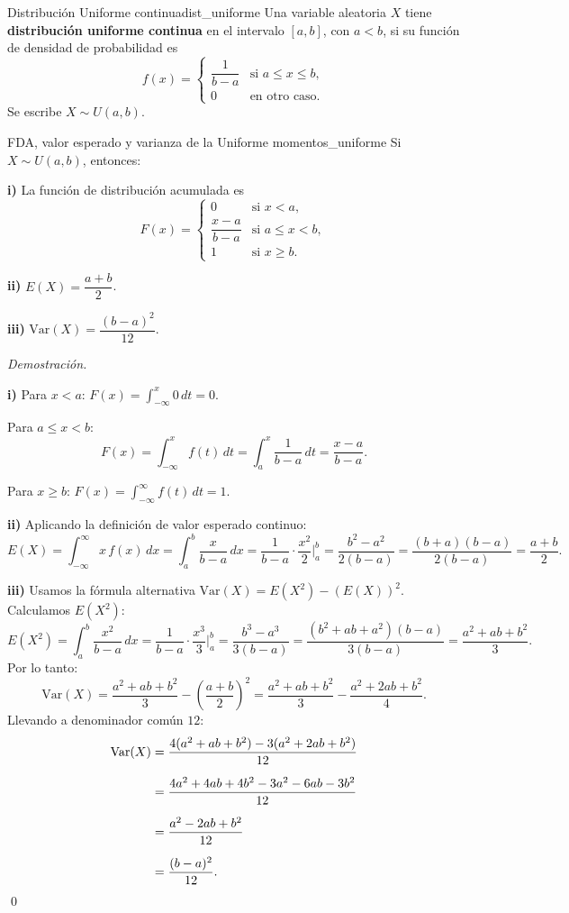 \documentclass[12pt, a4paper]{book}
\renewenvironment{proof}{%
    \par\medskip\noindent\textit{Demostraci\'{o}n.}\enspace
}{\qed\par\medskip}
\numberwithin{equation}{chapter}
\begin{document}
\begin{definicion}{Distribuci\'{o}n Uniforme continua}{dist_uniforme}
	Una variable aleatoria $X$ tiene \textbf{distribución uniforme
		continua} en el intervalo $[a,b]$, con $a < b$, si su función
	de densidad de probabilidad es
	\[
	f(x) = \begin{cases}
		\dfrac{1}{b-a} & \text{si } a \leq x \leq b, \\[6pt]
		0              & \text{en otro caso.}
	\end{cases}
	\]
	Se escribe $X \sim U(a,b)$.
\end{definicion}

\begin{proposicion}{FDA, valor esperado y varianza de la Uniforme}
	{momentos_uniforme}
	Si $X \sim U(a,b)$, entonces:
	
	\medskip
	\noindent\textbf{i)} La función de distribución acumulada es
	\[
	F(x) = \begin{cases}
		0                      & \text{si } x < a,        \\[4pt]
		\dfrac{x-a}{b-a}       & \text{si } a \leq x < b, \\[6pt]
		1                      & \text{si } x \geq b.
	\end{cases}
	\]
	
	\medskip
	\noindent\textbf{ii)} $E(X) = \dfrac{a+b}{2}$.
	
	\medskip
	\noindent\textbf{iii)} $\mathrm{Var}(X) = \dfrac{(b-a)^2}{12}$.
\end{proposicion}

\begin{proof}
	\textbf{i)} Para $x < a$: $F(x) = \int_{-\infty}^x 0\,dt = 0$.
	
	Para $a \leq x < b$:
	\[
	F(x) = \int_{-\infty}^{x} f(t)\,dt
	= \int_a^x \frac{1}{b-a}\,dt
	= \frac{x-a}{b-a}.
	\]
	
	Para $x \geq b$: $F(x) = \int_{-\infty}^{\infty} f(t)\,dt = 1$.
	
	\medskip
	\textbf{ii)} Aplicando la definición de valor esperado continuo:
	\[
	E(X) = \int_{-\infty}^{\infty} x\,f(x)\,dx
	= \int_a^b \frac{x}{b-a}\,dx
	= \frac{1}{b-a} \cdot \frac{x^2}{2}\Bigg|_a^b
	= \frac{b^2 - a^2}{2(b-a)}
	= \frac{(b+a)(b-a)}{2(b-a)}
	= \frac{a+b}{2}.
	\]
	
	\medskip
	\textbf{iii)} Usamos la fórmula alternativa
	$\mathrm{Var}(X) = E(X^2) - (E(X))^2$. Calculamos $E(X^2)$:
	\[
	E(X^2) = \int_a^b \frac{x^2}{b-a}\,dx
	= \frac{1}{b-a} \cdot \frac{x^3}{3}\Bigg|_a^b
	= \frac{b^3 - a^3}{3(b-a)}
	= \frac{(b^2+ab+a^2)(b-a)}{3(b-a)}
	= \frac{a^2+ab+b^2}{3}.
	\]
	Por lo tanto:
	\[
	\mathrm{Var}(X)
	= \frac{a^2+ab+b^2}{3} - \left(\frac{a+b}{2}\right)^2
	= \frac{a^2+ab+b^2}{3} - \frac{a^2+2ab+b^2}{4}.
	\]
Llevando a denominador com\'{u}n $12$:
\begin{align*}
	\mathrm{Var}(X)
	&= \frac{4(a^2+ab+b^2) - 3(a^2+2ab+b^2)}{12} \\[6pt]
	&= \frac{4a^2+4ab+4b^2-3a^2-6ab-3b^2}{12} \\[6pt]
	&= \frac{a^2-2ab+b^2}{12} \\[6pt]
	&= \frac{(b-a)^2}{12}. \qedhere
\end{align*}
\end{proof}
\end{document}
